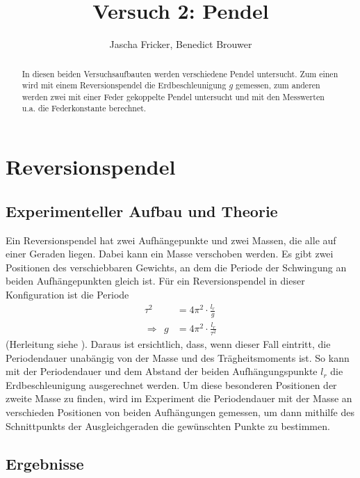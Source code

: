 \documentclass[11pt, a4paper]{article}
\title{Versuch 2: Pendel}
\author{Jascha Fricker, Benedict Brouwer}
\begin{document}
    \maketitle

    

    \begin{abstract}
        In diesen beiden Versuchsaufbauten werden verschiedene Pendel untersucht. Zum einen wird mit
        einem Reversionspendel die Erdbeschleunigung $g$ gemessen, zum anderen werden zwei mit einer Feder
        gekoppelte Pendel untersucht und mit den Messwerten u.a. die Federkonstante berechnet.
    \end{abstract}

    \tableofcontents

    \section{Reversionspendel}

    \subsection{Experimenteller Aufbau und Theorie}

    Ein Reversionspendel hat zwei Aufhängepunkte und zwei Massen, die alle auf einer Geraden liegen.
    Dabei kann ein Masse verschoben werden.
    Es gibt zwei Positionen des verschiebbaren Gewichts, an dem die Periode der Schwingung an beiden
    Aufhängepunkten gleich ist. Für ein Reversionspendel in dieser Konfiguration ist die Periode
    \begin{align}
         \tau^2 &= 4\pi^2 \cdot \frac{l_r}{g} \\
        \Rightarrow \ \ g &= 4\pi^2 \cdot \frac{l_r}{\tau^2}
    \end{align}
    (Herleitung siehe \cite[Abschitt 1.3]{pen}). Daraus ist ersichtlich, dass, wenn dieser Fall eintritt, die Periodendauer unabängig von der Masse und des
    Trägheitsmoments ist. So kann mit der Periodendauer und dem Abstand der beiden Aufhängungspunkte $l_r$
    die Erdbeschleunigung ausgerechnet werden.
    Um diese besonderen Positionen der zweite Masse zu finden, wird im Experiment die Periodendauer
    mit der Masse an verschieden Positionen von beiden Aufhängungen gemessen,
    um dann mithilfe des Schnittpunkts der Ausgleichgeraden die gewünschten
    Punkte  zu bestimmen.



    \subsection{Ergebnisse}
\end{document}
